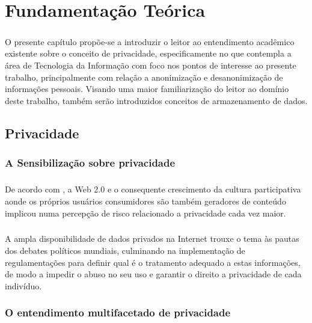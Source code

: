 \chapter{Fundamentação Teórica}
\label{cap2}

\paragraph{} O presente capítulo propõe-se a introduzir o leitor ao entendimento acadêmico existente sobre o conceito de privacidade, especificamente no que contempla a área de Tecnologia da Informação com foco nos pontos de interesse ao presente trabalho,
principalmente com relação a anonimização e desanonimização de informações pessoais. 
Visando uma maior familiarização do leitor ao domínio deste trabalho, também serão introduzidos conceitos de armazenamento de dados.

\section{Privacidade}

\subsection{A Sensibilização sobre privacidade}

\paragraph{} De acordo com \cite{lgpd-evandro}, a Web 2.0 e o consequente crescimento da cultura participativa
aonde os próprios usuários consumidores são também geradores de conteúdo implicou numa
percepção de risco relacionado a privacidade cada vez maior.

\paragraph{} A ampla disponibilidade de dados privados na Internet trouxe o tema às pautas dos debates políticos 
mundiais, culminando na implementação de regulamentações para definir qual é o tratamento adequado
a estas informações, de modo a impedir o abuso no seu uso e garantir o direito a privacidade
de cada indivíduo.


\subsection{O entendimento multifacetado de privacidade}


